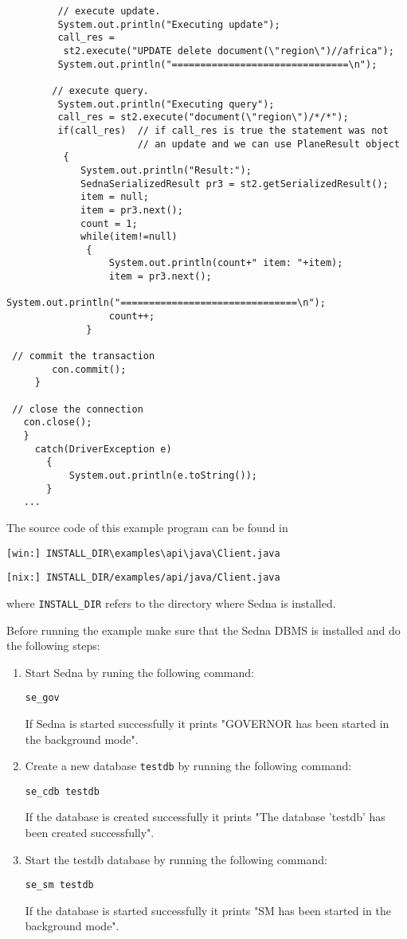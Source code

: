 \documentclass[a4paper,12pt]{article}
\begin{document}
{\begin{verbatim}
         // execute update.
         System.out.println("Executing update");
         call_res =
          st2.execute("UPDATE delete document(\"region\")//africa");
         System.out.println("===============================\n");

        // execute query.
         System.out.println("Executing query");
         call_res = st2.execute("document(\"region\")/*/*");
         if(call_res)  // if call_res is true the statement was not
                       // an update and we can use PlaneResult object
          {
             System.out.println("Result:");
             SednaSerializedResult pr3 = st2.getSerializedResult();
             item = null;
             item = pr3.next();
             count = 1;
             while(item!=null)
              {
                  System.out.println(count+" item: "+item);
                  item = pr3.next();
                  System.out.println("===============================\n");
                  count++;
              }

 // commit the transaction
        con.commit();
     }

 // close the connection
   con.close();
   }
     catch(DriverException e)
       {
           System.out.println(e.toString());
       }
   ...
\end{verbatim}
}


The source code of this example program can be found in
\begin{verbatim}
[win:] INSTALL_DIR\examples\api\java\Client.java
\end{verbatim}
\begin{verbatim}
[nix:] INSTALL_DIR/examples/api/java/Client.java
\end{verbatim}
where \verb!INSTALL_DIR! refers to the directory where Sedna is installed.

Before running the example make sure that the Sedna DBMS is installed and do the following steps:
\begin{enumerate}
\item Start Sedna by runing the following command:
\begin{verbatim}
se_gov
\end{verbatim}
If Sedna is started successfully it prints "GOVERNOR has been started in
the background mode".
\item Create a new database \verb!testdb! by running the following command:
\begin{verbatim}
se_cdb testdb
\end{verbatim}
If the database is created successfully it prints "The database 'testdb'
has been created successfully".
\item Start the testdb database by running the following command:
\begin{verbatim}
se_sm testdb
\end{verbatim}
If the database is started successfully it prints "SM has been started in
the background mode".
\end{enumerate}
\end{document}

